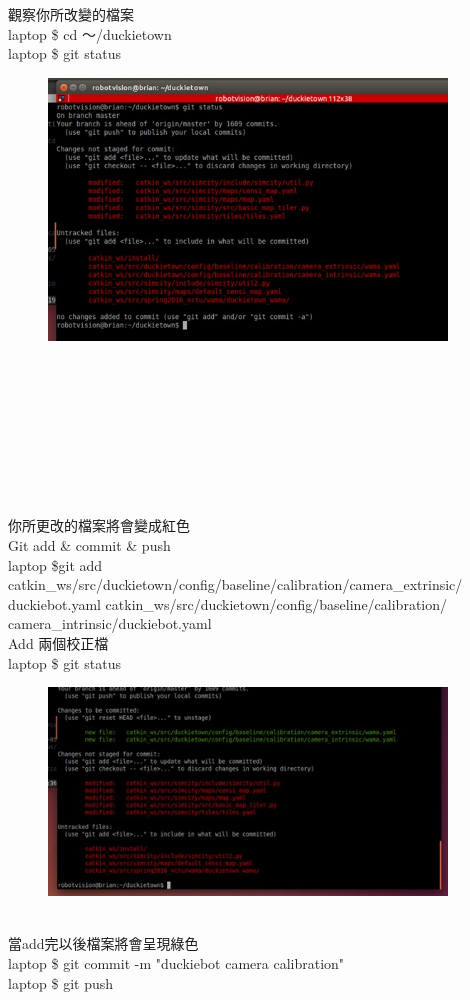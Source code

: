 \documentclass{article}
\begin{document}
觀察你所改變的檔案
\\laptop \$ cd ～/duckietown
\\laptop \$ git status
\\
\begin{figure}[htp]
    \begin{center}
        \includegraphics[width=300pt]{pic/圖片17.jpg}
    \end{center}
\end{figure}
\\\\\\\\\\\\\\\\
你所更改的檔案將會變成紅色
\\Git add \& commit \& push
\\laptop \$git add catkin\_ws/src/duckietown/config/baseline/calibration/camera\_extrinsic/ duckiebot.yaml catkin\_ws/src/duckietown/config/baseline/calibration/ camera\_intrinsic/duckiebot.yaml
\\Add 兩個校正檔
\\laptop \$ git status
\\
\begin{figure}[htp]
    \begin{center}
        \includegraphics[width=300pt]{pic/圖片18.jpg}
    \end{center}
\end{figure}
\\
當add完以後檔案將會呈現綠色
\\laptop \$ git commit -m "duckiebot camera calibration"
\\laptop \$ git push
\end{document}
